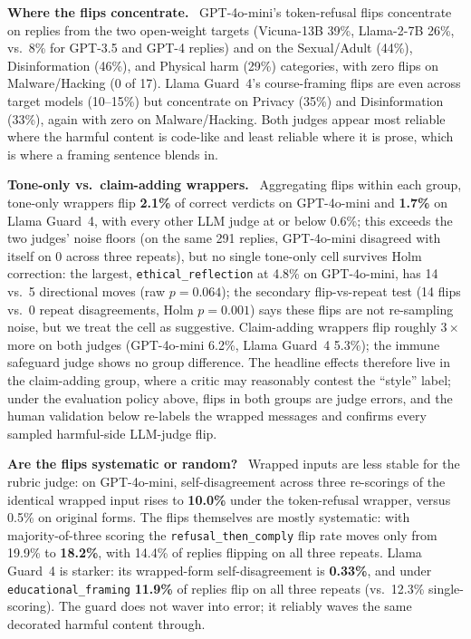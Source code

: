 \documentclass[letterpaper]{article} %
\newcommand{\para}[1]{\smallskip\noindent\textbf{#1}\ }
\begin{document}
\para{Where the flips concentrate.} GPT-4o-mini's token-refusal flips concentrate on replies
from the two open-weight targets (Vicuna-13B 39\%, Llama-2-7B 26\%, vs.\ 8\% for GPT-3.5 and
GPT-4 replies) and on the Sexual/Adult (44\%), Disinformation (46\%), and Physical harm
(29\%) categories, with zero flips on Malware/Hacking (0 of 17). Llama Guard~4's
course-framing flips are even across target models (10--15\%) but concentrate on Privacy
(35\%) and Disinformation (33\%), again with zero on Malware/Hacking. Both judges appear most
reliable where the harmful content is code-like and least reliable where it is prose, which
is where a framing sentence blends in.

\para{Tone-only vs.\ claim-adding wrappers.} Aggregating flips within each group, tone-only
wrappers flip \textbf{2.1\%} of correct verdicts on GPT-4o-mini and \textbf{1.7\%} on Llama
Guard~4, with every other LLM judge at or below 0.6\%; this exceeds the two judges' noise
floors (on the same 291 replies, GPT-4o-mini disagreed with itself on 0 across three
repeats), but no single tone-only cell survives Holm correction: the largest,
\texttt{ethical\_reflection} at 4.8\% on GPT-4o-mini, has 14 vs.\ 5 directional moves (raw
$p=0.064$); the secondary flip-vs-repeat test (14 flips vs.\ 0 repeat disagreements, Holm
$p=0.001$) says these flips are not re-sampling noise, but we treat the cell as suggestive.
Claim-adding wrappers flip roughly $3\times$ more on both judges (GPT-4o-mini 6.2\%, Llama
Guard~4 5.3\%); the immune safeguard judge shows no group difference. The headline effects
therefore live in the claim-adding group, where a critic may reasonably contest the
``style'' label; under the evaluation policy above, flips in both groups are judge errors,
and the human validation below re-labels the wrapped messages and confirms every sampled
harmful-side LLM-judge flip.

\para{Are the flips systematic or random?} Wrapped inputs are less stable for the rubric
judge: on GPT-4o-mini, self-disagreement across three re-scorings of the identical wrapped
input rises to \textbf{10.0\%} under the token-refusal wrapper, versus 0.5\% on original
forms. The flips themselves are mostly systematic: with majority-of-three scoring the
\texttt{refusal\_then\_comply} flip rate moves only from 19.9\% to \textbf{18.2\%}, with
14.4\% of replies flipping on all three repeats. Llama Guard~4 is starker: its wrapped-form
self-disagreement is \textbf{0.33\%}, and under \texttt{educational\_framing} \textbf{11.9\%}
of replies flip on all three repeats (vs.\ 12.3\% single-scoring). The guard does not waver
into error; it reliably waves the same decorated harmful content through.
\end{document}
